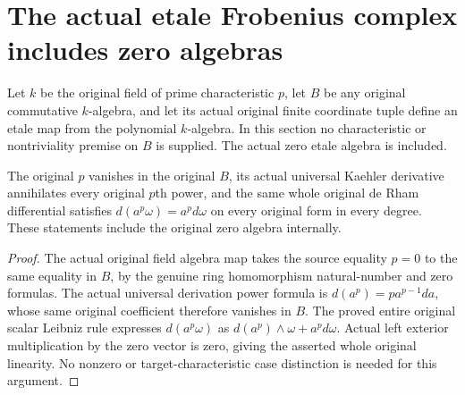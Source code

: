 \section{The actual etale Frobenius complex includes zero algebras}
\label{sec:etale-algebra-frobenius-complex}

Let $k$ be the original field of prime characteristic $p$, let $B$
be any original commutative $k$-algebra, and let its actual original
finite coordinate tuple define an etale map from the polynomial
$k$-algebra. In this section no characteristic or nontriviality
premise on $B$ is supplied. The actual zero etale algebra is included.

\begin{theorem}
\label{lem:cartier-original-algebra-zero-frobenius-linearity}
\leanok
The original $p$ vanishes in the original $B$, its actual universal
Kaehler derivative annihilates every original $p$th power, and the
same whole original de Rham differential satisfies
$d(a^p\omega)=a^p d\omega$ on every original form in every degree.
These statements include the original zero algebra internally.
\end{theorem}
\begin{proof}
The actual original field algebra map takes the source equality
$p=0$ to the same equality in $B$, by the genuine ring homomorphism
natural-number and zero formulas. The actual universal derivation
power formula is $d(a^p)=p a^{p-1}da$, whose same original coefficient
therefore vanishes in $B$. The proved entire original
scalar Leibniz rule expresses $d(a^p\omega)$ as
$d(a^p)\wedge\omega+a^p d\omega$. Actual left exterior multiplication
by the zero vector is zero, giving the asserted whole original
linearity. No nonzero or target-characteristic case distinction is
needed for this argument.
\end{proof}

